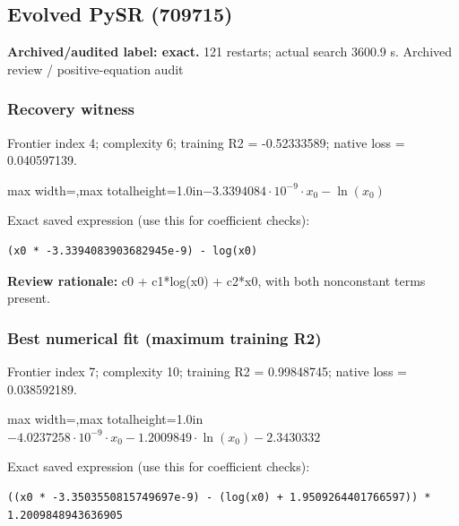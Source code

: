 \documentclass[10pt,letterpaper,landscape]{article}
\begin{document}
\begin{minipage}[t]{0.485\textwidth}
\subsection*{Evolved PySR (709715)}
\textbf{Archived/audited label: exact.} 121 restarts; actual search 3600.9 s.
{\small Archived review / positive-equation audit}
\subsubsection*{Recovery witness}
Frontier index 4; complexity 6; training R2 = -0.52333589; native loss = 0.040597139.
\begin{center}\begin{adjustbox}{max width=\linewidth,max totalheight=1.0in}$\displaystyle - 3.3394084 \cdot 10^{-9} \cdot x_{0} - \ln{\left(x_{0} \right)}$\end{adjustbox}\end{center}
{\scriptsize Exact saved expression (use this for coefficient checks):}
\begin{lstlisting}
(x0 * -3.3394083903682945e-9) - log(x0)
\end{lstlisting}
{\small\textbf{Review rationale:} c0 + c1*log(x0) + c2*x0, with both nonconstant terms present.}
\subsubsection*{Best numerical fit (maximum training R2)}
Frontier index 7; complexity 10; training R2 = 0.99848745; native loss = 0.038592189.
\begin{center}\begin{adjustbox}{max width=\linewidth,max totalheight=1.0in}$\displaystyle - 4.0237258 \cdot 10^{-9} \cdot x_{0} - 1.2009849 \cdot \ln{\left(x_{0} \right)} - 2.3430332$\end{adjustbox}\end{center}
{\scriptsize Exact saved expression (use this for coefficient checks):}
\begin{lstlisting}
((x0 * -3.3503550815749697e-9) - (log(x0) + 1.9509264401766597)) * 1.2009848943636905
\end{lstlisting}
\end{minipage}
\clearpage{}\label{schechter-10003}
\end{document}
